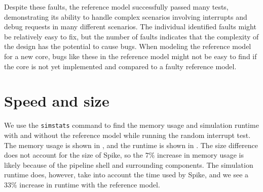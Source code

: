 Despite these faults, the reference model successfully passed many tests, demonstrating its ability to handle complex scenarios involving interrupts and debug requests in many different scenarios. The individual identified faults might be relatively easy to fix, but the number of faults indicates that the complexity of the design has the potential to cause bugs. When modeling the reference model for a new core, bugs like these in the reference model might not be easy to find if the core is not yet implemented and compared to a faulty reference model.



\pagebreak

\section{Speed and size}
\label{sec:res_sizespeed}

\begin{sloppy}
We use the \lstinline{simstats} command to find the memory usage and simulation runtime with and without the reference model while running the random interrupt test. The memory usage is shown in , and the runtime is shown in \mbox{}. The size difference does not account for the size of Spike, so the $7\%$ increase in memory usage is likely because of the pipeline shell and surrounding components. The simulation runtime does, however, take into account the time used by Spike, and we see a $33\%$ increase in runtime with the reference model.
\end{sloppy}


